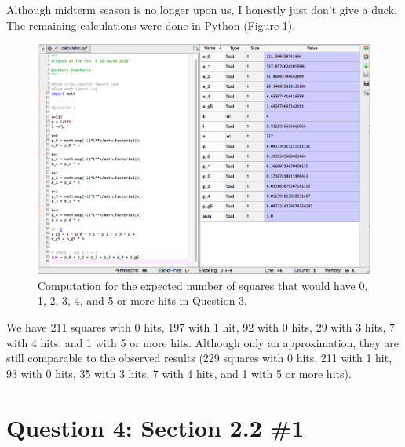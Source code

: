 \documentclass[11pt, oneside]{article}   	%
\begin{document}
Although midterm season is no longer upon us, I honestly just don't give a duck. The remaining calculations were done in Python (Figure \ref{lazy}). 
    \begin{figure}[h]                                         
    \begin{center}
        \includegraphics[width=.95\textwidth]{lazy.png}  
        \caption{Computation for the expected number of squares that would have 0, 1, 2, 3, 4, and 5 or more hits in Question 3.} 
        \label{lazy} 
    \end{center}
    \end{figure}
    
We have 211 squares with 0 hits, 197 with 1 hit, 92 with 0 hits, 29 with 3 hits, 7 with 4 hits, and 1 with 5 or more hits. Although only an approximation, they are still comparable to the observed results (229 squares with 0 hits, 211 with 1 hit, 93 with 0 hits, 35 with 3 hits, 7 with 4 hits, and 1 with 5 or more hits).

\section*{Question 4: Section 2.2 \#1}
\end{document}

